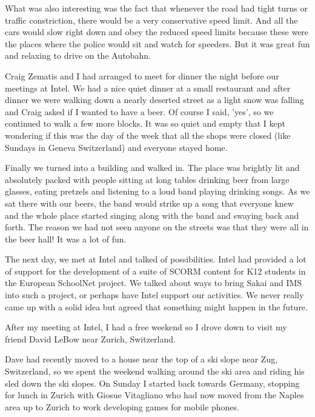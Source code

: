 \documentclass[12pt]{book}
\begin{document}
What was also interesting was the fact that whenever the road
had tight turns or traffic constriction, there would be a very
conservative speed limit.  And all the cars would slow right down
and obey the reduced speed limits because these were the places
where the police would sit and watch for speeders.  But it was great
fun and relaxing to drive on the Autobahn.

Craig Zematis and I had arranged to meet for dinner the night before
our meetings at Intel.   We had a nice quiet dinner at a small restaurant
and after dinner we were walking down a nearly deserted street as a light
snow was falling and Craig asked if I wanted to have a beer.  Of course
I said, 'yes', so we continued to walk a few more blocks.  It was
so quiet and empty that I kept wondering if this was the day of the
week that all the shops were closed (like Sundays in
Geneva Switzerland) and everyone stayed home.

Finally we turned into a building and walked in.  The place was
brightly lit and absolutely packed with people sitting at long tables
drinking beer from large glasses, eating pretzels and listening to
a loud band playing drinking songs.    As we sat there with our beers,
the band would strike up a song that everyone knew and the whole place started
singing along with the band and swaying back and forth.  The reason
we had not seen anyone on the streets was that they were all in
the beer hall!   It was a lot of fun.

The next day, we met at Intel and talked of possibilities.   Intel
had provided a lot of support for the development of a suite of SCORM
content for K12 students in the European SchoolNet project.  We talked
about ways to bring Sakai and IMS into such a project, or perhaps have
Intel support our activities.  We never really came up with a solid idea
but agreed that something might happen in the future.

After my meeting at Intel, I had a free weekend so I drove down to visit
my friend David LeBow near Zurich, Switzerland.

Dave had recently moved to a house near the top of a ski slope
near Zug, Switzerland,  so we spent the weekend walking around the ski area
and riding his sled down the ski slopes.  On Sunday I started back towards
Germany, stopping for lunch in Zurich with Giosue Vitagliano who had
now moved from the Naples area up to Zurich to work developing games
for mobile phones.
\end{document}
